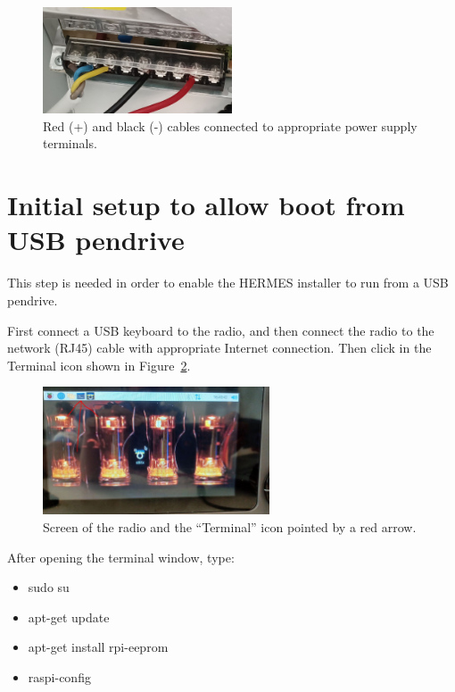 \documentclass[11pt,a4paper]{article}
\begin{document}
\begin{figure}[!ht]
  \centering
  \includegraphics[width=0.5\textwidth]{pictures/psu2.jpeg}
  \caption{Red (+) and black (-) cables connected to appropriate power supply terminals.}
  \label{fig:psu2}
\end{figure}


\section{Initial setup to allow boot from USB pendrive}

This step is needed in order to enable the HERMES installer to run from a USB pendrive.

First connect a USB keyboard to the radio, and then connect the radio to the network (RJ45) cable with appropriate Internet connection.
Then click in the Terminal icon shown in Figure~\ref{fig:terminal}.

\begin{figure}[!ht]
  \centering
  \includegraphics[width=0.6\textwidth]{pictures/screen1-edited.jpeg}
  \caption{Screen of the radio and the ``Terminal'' icon pointed by a red arrow.}
  \label{fig:terminal}
\end{figure}

After opening the terminal window, type:

\begin{itemize}
\item sudo su
\item apt-get update
\item apt-get install rpi-eeprom
\item raspi-config
\end{itemize}
\end{document}
